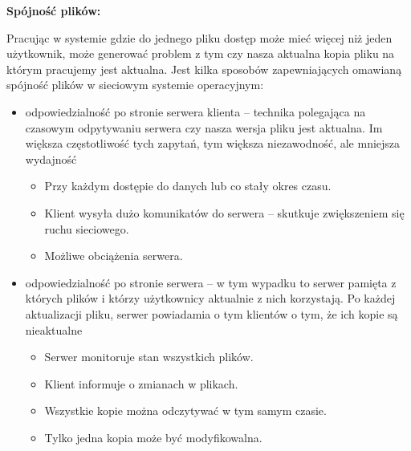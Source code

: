 \textbf{Spójność plików:}

Pracując w systemie gdzie do jednego pliku dostęp może mieć więcej niż jeden użytkownik, może generować problem z tym czy nasza aktualna kopia pliku na którym pracujemy jest aktualna. Jest kilka sposobów zapewniających omawianą spójność plików w sieciowym systemie operacyjnym:

\begin{itemize}
	\item odpowiedzialność po stronie serwera klienta – technika polegająca na czasowym odpytywaniu serwera czy nasza wersja pliku jest aktualna. Im większa częstotliwość tych zapytań, tym większa niezawodność, ale mniejsza wydajność
	\begin{itemize}
		\item Przy każdym dostępie do danych lub co stały okres czasu.
		\item Klient wysyła dużo komunikatów do serwera -- skutkuje zwiększeniem się ruchu sieciowego.
		\item Możliwe obciążenia serwera.
	\end{itemize}
	\item odpowiedzialność po stronie serwera – w tym wypadku to serwer pamięta z których plików i którzy użytkownicy aktualnie z nich korzystają. Po każdej aktualizacji pliku, serwer powiadamia o tym klientów o tym, że ich kopie są nieaktualne
	\begin{itemize}
		\item Serwer monitoruje stan wszystkich plików.
		\item Klient informuje o zmianach w plikach.
		\item Wszystkie kopie można odczytywać w tym samym czasie.
		\item Tylko jedna kopia może być modyfikowalna.
	\end{itemize}
\end{itemize}
